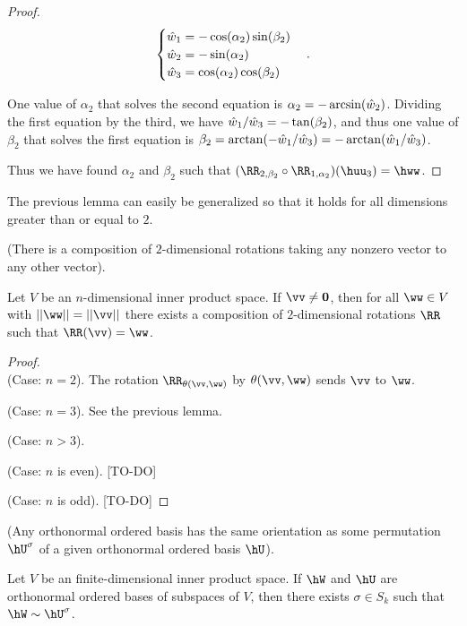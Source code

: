 \begin{proof}
    \begin{align*}
        \begin{cases}
            \hat{w}_1 = -\cos(\alpha_2) \sin(\beta_2) \\
            \hat{w}_2 = -\sin(\alpha_2) \\
            \hat{w}_3 = \cos(\alpha_2) \cos(\beta_2)
        \end{cases}.
    \end{align*}

    One value of $\alpha_2$ that solves the second equation is $\alpha_2 = -\arcsin(\hat{w}_2)$. Dividing the first equation by the third, we have $\hat{w}_1/\hat{w}_3 = -\tan(\beta_2)$, and thus one value of $\beta_2$ that solves the first equation is $\beta_2 = \arctan(-\hat{w}_1/\hat{w}_3) = -\arctan(\hat{w}_1/\hat{w}_3)$.

    Thus we have found $\alpha_2$ and $\beta_2$ such that $(\RR_{2, \beta_2} \circ \RR_{1, \alpha_2})(\huu_3) = \hww$.
\end{proof}

The previous lemma can easily be generalized so that it holds for all dimensions greater than or equal to $2$.

\begin{lemma}
    (There is a composition of $2$-dimensional rotations taking any nonzero vector to any other vector).
    
    Let $V$ be an $n$-dimensional inner product space. If $\vv \neq \mathbf{0}$, then for all $\ww \in V$ with $||\ww|| = ||\vv||$ there exists a composition of $2$-dimensional rotations $\RR$ such that $\RR(\vv) = \ww$.
\end{lemma}

\begin{proof}
    \mbox{} \\

    (Case: $n = 2$). The rotation $\RR_{\theta(\vv, \ww)}$ by $\theta(\vv, \ww)$ sends $\vv$ to $\ww$.
    
    (Case: $n = 3$). See the previous lemma.
    
    (Case: $n > 3$).
    
    \indent (Case: $n$ is even). [TO-DO]
    
    \indent (Case: $n$ is odd). [TO-DO]
\end{proof}

\begin{theorem}
\label{ch::lin_alg::thm::n_rot_acts_on_orthonormal_basis}
     (Any orthonormal ordered basis has the same orientation as some permutation $\hU^\sigma$ of a given orthonormal ordered basis $\hU$).
     
     Let $V$ be an finite-dimensional inner product space. If $\hW$ and $\hU$ are orthonormal ordered bases of subspaces of $V$, then there exists $\sigma \in S_k$ such that $\hW \sim \hU^\sigma$. 
\end{theorem}

